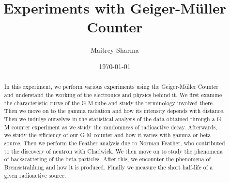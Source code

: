 \documentclass[%
 reprint,
nofootinbib,
 amsmath,amssymb,
 aps,
floatfix,
]{revtex4-2}
\begin{document}

\title{Experiments with Geiger-M\"{u}ller Counter}%


\author{Maitrey Sharma}




\date{\today}%

\begin{abstract}
    In this experiment, we perform various experiments using the Geiger-M\"{u}ller Counter and understand the working of the electronics and physics behind it. We first examine the characteristic curve of the G-M tube and study the terminology involved there. Then we move on to the gamma radiation and how its intensity depends with distance. Then we indulge ourselves in the statistical analysis of the data obtained through a G-M counter experiment as we study the randomness of radioactive decay. Afterwards, we study the efficiency of our G-M counter and how it varies with gamma or beta source. Then we perform the Feather analysis due to Norman Feather, who contributed to the discovery of neutron with Chadwick. We then move on to study the phenomena of backscattering of the beta particles. After this, we encounter the phenomena of Bremsstrahlung and how it is produced. Finally we measure the short half-life of a given radioactive source.
\end{abstract}

\maketitle

\end{document}
